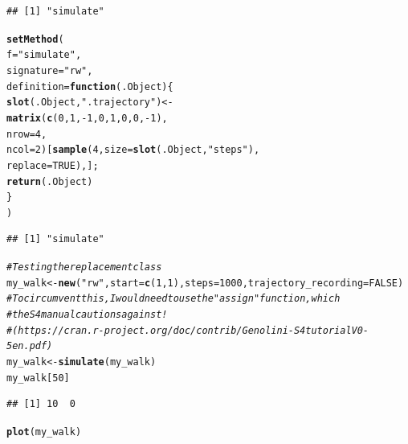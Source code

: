 \documentclass{article}\usepackage[]{graphicx}\usepackage[]{color}
\makeatletter
\newcommand{\hlnum}[1]{\textcolor[rgb]{0.686,0.059,0.569}{#1}}%
\newcommand{\hlstr}[1]{\textcolor[rgb]{0.192,0.494,0.8}{#1}}%
\newcommand{\hlcom}[1]{\textcolor[rgb]{0.678,0.584,0.686}{\textit{#1}}}%
\newcommand{\hlopt}[1]{\textcolor[rgb]{0,0,0}{#1}}%
\newcommand{\hlstd}[1]{\textcolor[rgb]{0.345,0.345,0.345}{#1}}%
\newcommand{\hlkwa}[1]{\textcolor[rgb]{0.161,0.373,0.58}{\textbf{#1}}}%
\newcommand{\hlkwb}[1]{\textcolor[rgb]{0.69,0.353,0.396}{#1}}%
\newcommand{\hlkwc}[1]{\textcolor[rgb]{0.333,0.667,0.333}{#1}}%
\newcommand{\hlkwd}[1]{\textcolor[rgb]{0.737,0.353,0.396}{\textbf{#1}}}%
\newenvironment{kframe}{%
 \def\at@end@of@kframe{}%
 \ifinner\ifhmode%
  \def\at@end@of@kframe{\end{minipage}}%
  \begin{minipage}{\columnwidth}%
 \fi\fi%
 \def\FrameCommand##1{\hskip\@totalleftmargin \hskip-\fboxsep
 \colorbox{shadecolor}{##1}\hskip-\fboxsep
     \hskip-\linewidth \hskip-\@totalleftmargin \hskip\columnwidth}%
 \MakeFramed {\advance\hsize-\width
   \@totalleftmargin\z@ \linewidth\hsize
   \@setminipage}}%
 {\par\unskip\endMakeFramed%
 \at@end@of@kframe}
\newenvironment{knitrout}{}{} %
\makeatother
\begin{document}
\begin{knitrout}
\begin{kframe}
{\ttfamily\noindent\itshape\color{messagecolor}{\#\# Creating a new generic function for 'simulate' in the global environment}}\begin{verbatim}
## [1] "simulate"
\end{verbatim}
\begin{alltt}
\hlkwd{setMethod}\hlstd{(}
  \hlkwc{f}\hlstd{=}\hlstr{"simulate"}\hlstd{,}
  \hlkwc{signature}\hlstd{=}\hlstr{"rw"}\hlstd{,}
  \hlkwc{definition}\hlstd{=}\hlkwa{function}\hlstd{(}\hlkwc{.Object}\hlstd{)\{}
    \hlkwd{slot}\hlstd{(.Object,}\hlstr{".trajectory"}\hlstd{)} \hlkwb{<-}
      \hlkwd{matrix}\hlstd{(}\hlkwd{c}\hlstd{(}\hlnum{0}\hlstd{,} \hlnum{1}\hlstd{,} \hlopt{-}\hlnum{1}\hlstd{,} \hlnum{0}\hlstd{,} \hlnum{1}\hlstd{,} \hlnum{0}\hlstd{,} \hlnum{0}\hlstd{,} \hlopt{-}\hlnum{1}\hlstd{),}
             \hlkwc{nrow}\hlstd{=}\hlnum{4}\hlstd{,}
             \hlkwc{ncol}\hlstd{=}\hlnum{2}\hlstd{)[}\hlkwd{sample}\hlstd{(}\hlnum{4}\hlstd{,}\hlkwc{size}\hlstd{=}\hlkwd{slot}\hlstd{(.Object,}\hlstr{"steps"}\hlstd{),}
             \hlkwc{replace}\hlstd{=}\hlnum{TRUE}\hlstd{),];}
    \hlkwd{return}\hlstd{(.Object)}
  \hlstd{\}}
\hlstd{)}
\end{alltt}
\begin{verbatim}
## [1] "simulate"
\end{verbatim}
\begin{alltt}
\hlcom{# Testing the replacement class}
\hlstd{my_walk} \hlkwb{<-} \hlkwd{new}\hlstd{(}\hlstr{"rw"}\hlstd{,} \hlkwc{start}\hlstd{=}\hlkwd{c}\hlstd{(}\hlnum{1}\hlstd{,}\hlnum{1}\hlstd{),}\hlkwc{steps}\hlstd{=}\hlnum{1000}\hlstd{,}\hlkwc{trajectory_recording}\hlstd{=}\hlnum{FALSE}\hlstd{)}
\hlcom{# To circumvent this, I would need to use the "assign" function, which}
\hlcom{# the S4 manual cautions against! }
\hlcom{# (https://cran.r-project.org/doc/contrib/Genolini-S4tutorialV0-5en.pdf)}
\hlstd{my_walk} \hlkwb{<-} \hlkwd{simulate}\hlstd{(my_walk)}
\hlstd{my_walk[}\hlnum{50}\hlstd{]}
\end{alltt}
\begin{verbatim}
## [1] 10  0
\end{verbatim}
\begin{alltt}
\hlkwd{plot}\hlstd{(my_walk)}
\end{alltt}
\end{kframe}

\end{knitrout}
\end{document}
